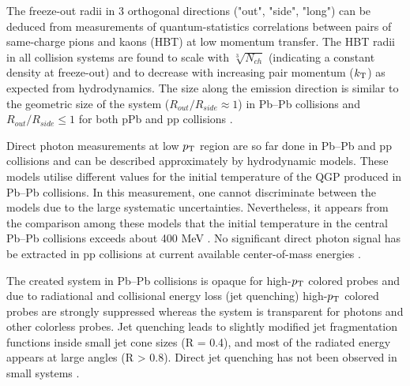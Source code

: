 \documentclass[../report.tex]{subfiles}
\begin{document}
The freeze-out radii in 3 orthogonal directions ("out", "side", "long") can be deduced from measurements of quantum-statistics correlations between pairs of same-charge pions and kaons (HBT) at low momentum transfer. The HBT radii in all collision systems are found to scale with $\sqrt[3]{N_{ch}}$ (indicating a constant density at freeze-out) and to decrease with increasing pair momentum ($k_{\rm{T}}$) as expected from hydrodynamics. The size along the emission direction is similar to the geometric size of the system ($R_{out}/R_{side} \approx 1$) in Pb--Pb collisions  \cite{Adam:2015vna,Adam:2015vja,Abelev:2014pja,CMS:2014mla,Acharya:2017qtq,Acharya:2017qtq} and $R_{out}/R_{side} \leq 1$ for both pPb and pp collisions \cite{Abelev:2014pja,Adam:2015pya,Aamodt:2011kd,CMS:2014mla,Aaboud:2017xpw}.

Direct photon measurements at low $p_{\rm{T}}$ region are so far done in Pb--Pb and pp collisions and can be described approximately by hydrodynamic models. These models utilise different values for the initial temperature of the QGP produced in Pb--Pb collisions. In this measurement, one cannot discriminate between the models due to the large systematic uncertainties. Nevertheless, it appears from the comparison among these models that the initial temperature in the central Pb--Pb collisions exceeds about 400 MeV \cite{Adam:2015lda}. No significant direct photon signal has be extracted in pp collisions at current available center-of-mass energies \cite{Acharya:2018dqe}. 

The created system in Pb--Pb collisions is opaque for high-$p_{\rm{T}}$ colored probes and due to radiational and collisional energy loss (jet quenching) high-$p_{\rm{T}}$ colored probes are strongly suppressed whereas the system is transparent for photons and other colorless probes. Jet quenching leads to slightly modified jet fragmentation functions inside small jet cone sizes (R = 0.4), and most of the radiated energy appears at large angles (R > 0.8). Direct jet quenching has not been observed in small systems \cite{Aad:2010bu,Aamodt:2010jd,Chatrchyan:2011sx,CMS:2012aa,Abelev:2012hxa,ALICE:2012ab,Aad:2014bxa,Adam:2015ewa,Aad:2015wga,Adam:2016jfp,Adam:2016xbp,Sirunyan:2017jic,Sirunyan:2016fcs,Sirunyan:2018jqr,Sirunyan:2018jju,Sirunyan:2018qec,Sirunyan:2017qhf,Khachatryan:2016tfj,Sirunyan:2017bsd,Aaboud:2017bzv,Aaboud:2017eww}. 
\end{document}
